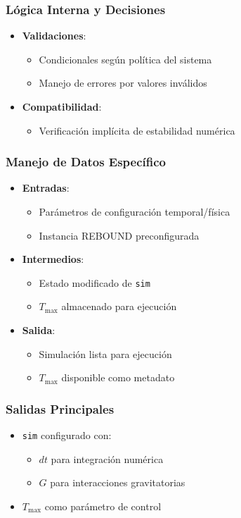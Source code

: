 \subsubsection{Lógica Interna y Decisiones}
\begin{itemize}
    \item \textbf{Validaciones}:
    \begin{itemize}
        \item Condicionales según política del sistema
        \item Manejo de errores por valores inválidos
    \end{itemize}
    \item \textbf{Compatibilidad}:
    \begin{itemize}
        \item Verificación implícita de estabilidad numérica
    \end{itemize}
\end{itemize}

\subsubsection{Manejo de Datos Específico}
\begin{itemize}
    \item \textbf{Entradas}:
    \begin{itemize}
        \item Parámetros de configuración temporal/física
        \item Instancia REBOUND preconfigurada
    \end{itemize}
    \item \textbf{Intermedios}:
    \begin{itemize}
        \item Estado modificado de \texttt{sim}
        \item $T_{\text{max}}$ almacenado para ejecución
    \end{itemize}
    \item \textbf{Salida}:
    \begin{itemize}
        \item Simulación lista para ejecución
        \item $T_{\text{max}}$ disponible como metadato
    \end{itemize}
\end{itemize}

\subsubsection{Salidas Principales}
\begin{itemize}
    \item \texttt{sim} configurado con:
    \begin{itemize}
        \item $dt$ para integración numérica
        \item $G$ para interacciones gravitatorias
    \end{itemize}
    \item $T_{\text{max}}$ como parámetro de control
\end{itemize}

